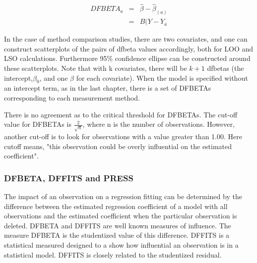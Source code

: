 \documentclass[12pt, a4paper]{report}
\theoremstyle{plain}
\theoremstyle{definition}
\theoremstyle{remark}
\begin{document}
	
	
	\begin{eqnarray}
	DFBETA_{a} &=& \hat{\beta} - \hat{\beta}_{(a)} \\
	&=& B(Y-Y_{\bar{a}}
	\end{eqnarray}
		
		In the case of method comparison studies, there are two covariates, and one can construct scatterplots of the pairs of dfbeta values accordingly, both for LOO and LSO calculations. Furthermore 95\% confidence ellipse can be constructed around these scatterplots.
		Note that with k covariates, there will be $k+1$ dfbetas (the intercept,$\beta_0$, and one $\beta$ for each covariate). When the model is specified without an intercept term, as in the last chapter, there is a set of DFBETAs corresponding to each measurement method.
		
	
	


	There is no agreement as to the critical threshold for DFBETAs. The cut-off value for DFBETAs is $\frac{2}{\sqrt{n}}$, where n is the number of observations. 
	However, another cut-off is to look for observations with a value greater than 1.00. Here cutoff means, 
	"this observation could be overly influential on the estimated coefficient".
	
	\subsubsection{DFBETA, DFFITS and PRESS}
	
	The impact of an observation on a regression fitting can be determined by the difference between the estimated regression coefficient of a model with all observations and the estimated coefficient when the particular observation is deleted. DFBETA and DFFITS are well known measures of influence. The measure DFBETA is the studentized value of this difference. DFFITS is a statistical measured designed to a show how influential an observation is in a statistical model. DFFITS is closely related to the studentized residual.
	
\end{document}
